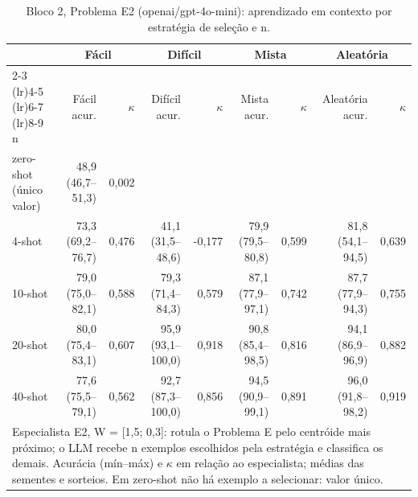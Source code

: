 \begin{table}[htbp]
\centering
\small
\caption{Bloco 2, Problema E2 (openai/gpt-4o-mini): aprendizado em contexto por estratégia de seleção e n.}
\label{tab:bloco2_E2_faseE_estrategia_x_nshot_gpt4mini}
\begin{tabular}{lrrrrrrrr}
\toprule
 & \multicolumn{2}{c}{Fácil} & \multicolumn{2}{c}{Difícil} & \multicolumn{2}{c}{Mista} & \multicolumn{2}{c}{Aleatória} \\ \cmidrule(lr){2-3} \cmidrule(lr){4-5} \cmidrule(lr){6-7} \cmidrule(lr){8-9}
n & Fácil acur. & $\kappa$ & Difícil acur. & $\kappa$ & Mista acur. & $\kappa$ & Aleatória acur. & $\kappa$ \\
\midrule
zero-shot (único valor) & 48,9 (46,7–51,3) & 0,002 &  &  &  &  &  &  \\
4-shot & 73,3 (69,2–76,7) & 0,476 & 41,1 (31,5–48,6) & -0,177 & 79,9 (79,5–80,8) & 0,599 & 81,8 (54,1–94,5) & 0,639 \\
10-shot & 79,0 (75,0–82,1) & 0,588 & 79,3 (71,4–84,3) & 0,579 & 87,1 (77,9–97,1) & 0,742 & 87,7 (77,9–94,3) & 0,755 \\
20-shot & 80,0 (75,4–83,1) & 0,607 & 95,9 (93,1–100,0) & 0,918 & 90,8 (85,4–98,5) & 0,816 & 94,1 (86,9–96,9) & 0,882 \\
40-shot & 77,6 (75,5–79,1) & 0,562 & 92,7 (87,3–100,0) & 0,856 & 94,5 (90,9–99,1) & 0,891 & 96,0 (91,8–98,2) & 0,919 \\
\bottomrule
\multicolumn{9}{p{0.95\linewidth}}{\footnotesize Especialista E2, W = [1,5; 0,3]: rotula o Problema E pelo centróide mais próximo; o LLM recebe n exemplos escolhidos pela estratégia e classifica os demais. Acurácia (mín–máx) e $\kappa$ em relação ao especialista; médias das sementes e sorteios. Em zero-shot não há exemplo a selecionar: valor único.} \\
\end{tabular}
\end{table}
